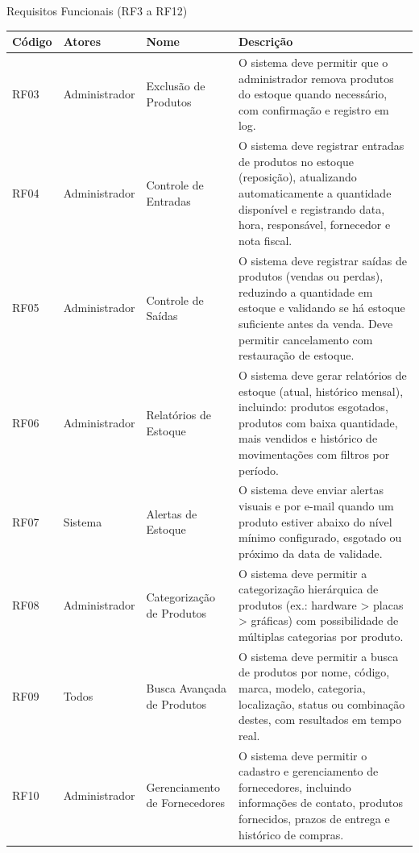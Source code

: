 \documentclass[
	12pt,				%
	openany,			%
	twoside,			%
	a4paper,			%
	english,			%
	brazil				%
	]{abntex2}
\begin{document}
\begin{quadro}[htb]
\caption{\label{quadro_rf2}Requisitos Funcionais (RF3 a RF12)}
\begin{tabular}{|p{1.0cm}|p{2.8cm}|p{4.2cm}|p{7.0cm}|}
    \hline
    \textbf{Código} & \textbf{Atores} & \textbf{Nome} & \textbf{Descrição} \\ \hline

      RF03 & Administrador & Exclusão de Produtos & O sistema deve permitir que o administrador remova produtos do estoque quando necessário, com confirmação e registro em log. \\ \hline


     RF04 & Administrador & Controle de Entradas & O sistema deve registrar entradas de produtos no estoque (reposição), atualizando automaticamente a quantidade disponível e registrando data, hora, responsável, fornecedor e nota fiscal. \\ \hline

    RF05 & Administrador & Controle de Saídas & O sistema deve registrar saídas de produtos (vendas ou perdas), reduzindo a quantidade em estoque e validando se há estoque suficiente antes da venda. Deve permitir cancelamento com restauração de estoque. \\ \hline

    RF06 & Administrador & Relatórios de Estoque & O sistema deve gerar relatórios de estoque (atual, histórico mensal), incluindo: produtos esgotados, produtos com baixa quantidade, mais vendidos e histórico de movimentações com filtros por período. \\ \hline

    RF07 & Sistema & Alertas de Estoque & O sistema deve enviar alertas visuais e por e-mail quando um produto estiver abaixo do nível mínimo configurado, esgotado ou próximo da data de validade. \\ \hline

    RF08 & Administrador & Categorização de Produtos & O sistema deve permitir a categorização hierárquica de produtos (ex.: hardware > placas > gráficas) com possibilidade de múltiplas categorias por produto. \\ \hline

    RF09 & Todos & Busca Avançada de Produtos & O sistema deve permitir a busca de produtos por nome, código, marca, modelo, categoria, localização, status ou combinação destes, com resultados em tempo real. \\ \hline

    RF10 & Administrador & Gerenciamento de Fornecedores & O sistema deve permitir o cadastro e gerenciamento de fornecedores, incluindo informações de contato, produtos fornecidos, prazos de entrega e histórico de compras. \\ \hline


\end{tabular}
\end{quadro}
\end{document}
